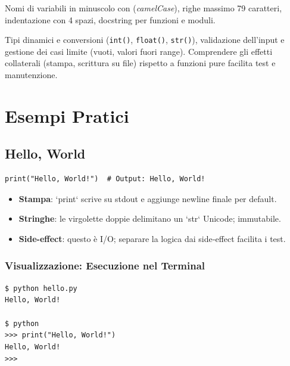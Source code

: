 \begin{tcolorbox}[title=Stile e Convenzioni]
	Nomi di variabili in minuscolo con (\emph{camelCase}), righe massimo 79 caratteri, indentazione con 4 spazi, docstring per funzioni e moduli.
\end{tcolorbox}

\begin{tcolorbox}[title=Concetti chiave]
	Tipi dinamici e conversioni (\texttt{int()}, \texttt{float()}, \texttt{str()}), validazione dell'input e gestione dei casi limite (vuoti, valori fuori range). Comprendere gli effetti collaterali (stampa, scrittura su file) rispetto a funzioni pure facilita test e manutenzione.
\end{tcolorbox}

\section{Esempi Pratici}
\label{sec:fond-esempi}

\subsection{Hello, World}
\label{subsec:fond-hello}
\begin{lstlisting}
print("Hello, World!")  # Output: Hello, World!
\end{lstlisting}
\begin{tcolorbox}[title=Spiegazione del codice]
	\begin{itemize}
		\item \textbf{Stampa}: `print` scrive su stdout e aggiunge newline finale per default.
		\item \textbf{Stringhe}: le virgolette doppie delimitano un `str` Unicode; immutabile.
		\item \textbf{Side-effect}: questo è I/O; separare la logica dai side‑effect facilita i test.
	\end{itemize}
\end{tcolorbox}

\subsubsection{Visualizzazione: Esecuzione nel Terminal}
\begin{tcolorbox}[title=Terminal Output]
\texttt{\$ python hello.py}\\
\texttt{Hello, World!}\\
\\
\texttt{\$ python}\\
\texttt{>>> print("Hello, World!")}\\
\texttt{Hello, World!}\\
\texttt{>>> }
\end{tcolorbox}

